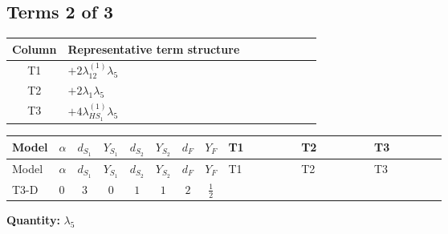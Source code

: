 \documentclass[8pt]{article}
\begin{document}
\begin{landscape}
\subsection*{Terms 2 of 3}
\begin{center}
\begin{tabular}{@{}c >{\raggedright\arraybackslash}p{0.82\linewidth}@{}}
\toprule
Column & Representative term structure \\
\midrule
T1 & \(\displaystyle +2 {\lambda_{12}^{(1)}} {\lambda_5}\) \\
\midrule
T2 & \(\displaystyle +2 {\lambda_1} {\lambda_5}\) \\
\midrule
T3 & \(\displaystyle +4 {\lambda_{HS_1}^{(1)}} {\lambda_5}\) \\
\midrule
\bottomrule
\end{tabular}
\end{center}
\smallskip
\tiny
\begin{longtable}{@{}llcccccc >{\raggedright\arraybackslash}p{0.21\linewidth} >{\raggedright\arraybackslash}p{0.21\linewidth} >{\raggedright\arraybackslash}p{0.21\linewidth}@{}}
\toprule
Model & $\alpha$ & $d_{S_1}$ & $Y_{S_1}$ & $d_{S_2}$ & $Y_{S_2}$ & $d_F$ & $Y_F$ & T1 & T2 & T3 \\
\midrule
\endfirsthead
\toprule
Model & $\alpha$ & $d_{S_1}$ & $Y_{S_1}$ & $d_{S_2}$ & $Y_{S_2}$ & $d_F$ & $Y_F$ & T1 & T2 & T3 \\
\midrule
\endhead
T3-D & $0$ & $3$ & $0$ & $1$ & $1$ & $2$ & $\frac{1}{2}$ & \scriptsize\adjustbox{max width=\linewidth}{$\begin{gathered} +2 {\lambda_{12}^{(1)}} {\lambda_5}\end{gathered}$} & \scriptsize\adjustbox{max width=\linewidth}{$\begin{gathered} +2 {\lambda_1} {\lambda_5}\end{gathered}$} & \scriptsize\adjustbox{max width=\linewidth}{$\begin{gathered} +4 {\lambda_{HS_1}^{(1)}} {\lambda_5}\end{gathered}$} \\
\midrule
\bottomrule
\end{longtable}
\clearpage
\noindent\textbf{Quantity: }$\lambda_5$\par\smallskip

\end{landscape}
\end{document}

